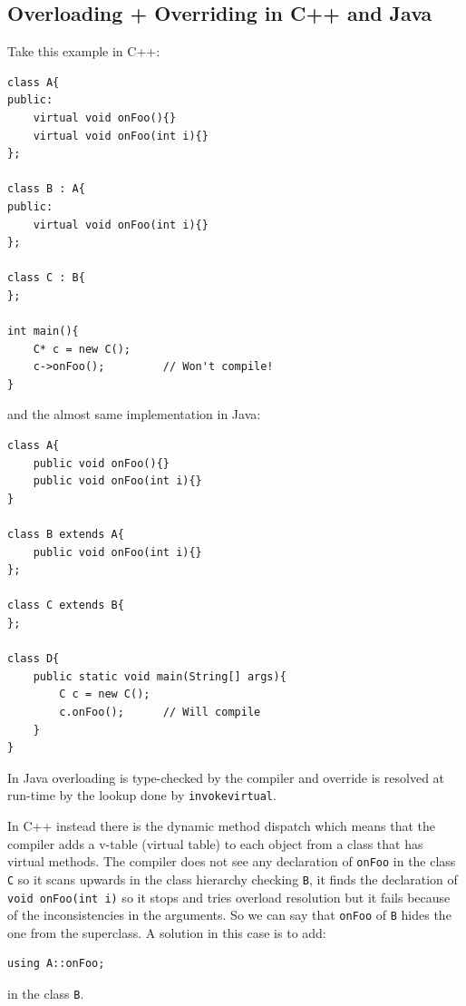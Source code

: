 \subsection{Overloading + Overriding in C++ and Java}
Take this example in C++:
\begin{verbatim}
class A{
public:
    virtual void onFoo(){}
    virtual void onFoo(int i){}
};

class B : A{
public:
    virtual void onFoo(int i){}    
};

class C : B{
};

int main(){
    C* c = new C();
    c->onFoo();         // Won't compile!
}
\end{verbatim}
and the almost same implementation in Java:
\begin{verbatim}
class A{
    public void onFoo(){}
    public void onFoo(int i){}
}

class B extends A{
    public void onFoo(int i){}    
};

class C extends B{
};

class D{
    public static void main(String[] args){
        C c = new C();
        c.onFoo();      // Will compile
    }
}
\end{verbatim}

In Java overloading is type-checked by the compiler and override is resolved at run-time by the lookup done by \verb|invokevirtual|.

In C++ instead there is the dynamic method dispatch which means that the compiler adds a v-table (virtual table) to each object from a class that has virtual methods.
The compiler does not see any declaration of \verb|onFoo| in the class \verb|C| so it scans upwards in the class hierarchy checking \verb|B|, it finds the declaration of \verb|void onFoo(int i)| so it stops and tries overload resolution but it fails because of the inconsistencies in the arguments.
So we can say that \verb|onFoo| of \verb|B| hides the one from the superclass.
A solution in this case is to add:
\begin{verbatim}
using A::onFoo;
\end{verbatim}
in the class \verb|B|.

